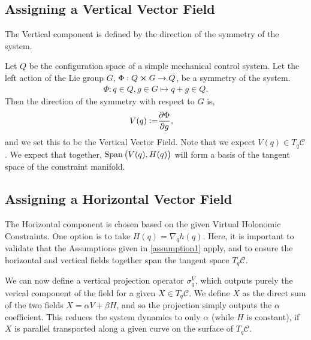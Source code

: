 \documentclass[main.tex]{subfiles}
\begin{document}
\subsection{Assigning a Vertical Vector Field}
The Vertical component is defined by the direction of the symmetry of the system. 

Let $Q$ be the configuration space of a simple mechanical control system. Let the left action of the Lie group $G$, $\Phi:Q\cross G\to Q$, be a symmetry of the system.
    \begin{align}
        \Phi:q\in Q,g\in G\mapsto q + g\in Q.
    \end{align}
Then the direction of the symmetry with respect to $G$ is,
    \begin{align}
        V(q):=&\pdv{\Phi}{g},
    \end{align}
and we set this to be the Vertical Vector Field. Note that we expect $V(q)\in T_q\mathcal{C}$. We expect that together, $\Span{V(q),H(q)}$ will form a basis of the tangent space of the constraint manifold.

\subsection{Assigning a Horizontal Vector Field}
The Horizontal component is chosen based on the given Virtual Holonomic Constraints.
One option is to take $H(q)=\nabla_q h(q)$.
Here, it is important to validate that the  Assumptions given in \ref{assumption1} apply, and to ensure the horizontal and vertical fields together span the tangent space $T_q\mathcal{C}$.

We can now define a vertical projection operator $\sigma^V_q$, which outputs purely the verical component of the field for a given
$X\in T_q\mathcal{C}$. We define $X$ as the direct sum of the two fields
$X=\alpha V+\beta H$, and so the projection simply outputs the $\alpha$ coefficient.
This reduces the system dynamics to only $\alpha$ (while $H$ is constant), if $X$ is parallel transported along a given curve on the surface of $T_q\mathcal{C}$.
\end{document}

